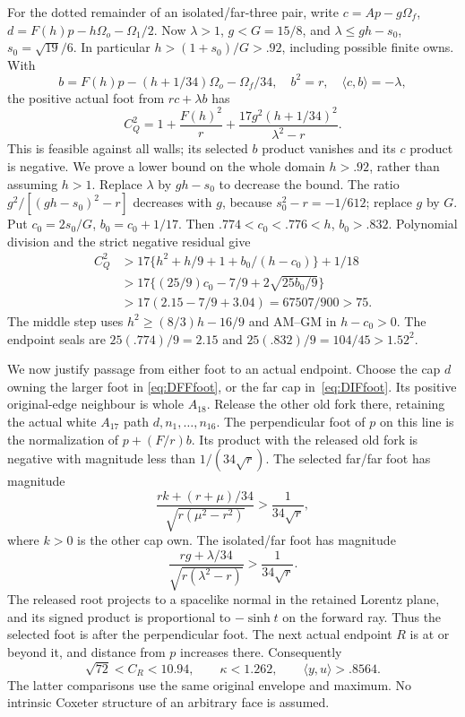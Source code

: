 \documentclass[11pt]{article}
\theoremstyle{definition}
\theoremstyle{remark}
\newcommand{\ip}[2]{\langle #1,#2\rangle}
\begin{document}
For the dotted remainder of an isolated/far-three pair,
write \(c=Ap-g\Omega_f\), \(d=F(h)p-h\Omega_o-\Omega_1/2\).
Now \(\lambda>1\), \(g<G=15/8\), and
\(\lambda\le gh-s_0\), \(s_0=\sqrt{19}/6\).
In particular \(h>(1+s_0)/G>.92\), including possible finite owns.
With
\[
 b=F(h)p-(h+1/34)\Omega_o-\Omega_f/34,\quad b^2=r,\quad
 \ip cb=-\lambda,
\]
the positive actual foot from \(rc+\lambda b\) has
\[
 C_Q^2=1+{\frac{F(h)^2}{ r}}
           +{\frac{17g^2(h+1/34)^2}{\lambda^2-r}}.
\]
This is feasible against all walls; its selected \(b\) product
vanishes and its \(c\) product is negative.
We prove a lower bound on the whole domain \(h>.92\),
rather than assuming \(h>1\).
Replace \(\lambda\) by \(gh-s_0\) to decrease the bound.
The ratio \(g^2/[(gh-s_0)^2-r]\) decreases with \(g\),
because \(s_0^2-r=-1/612\); replace \(g\) by \(G\).
Put \(c_0=2s_0/G\), \(b_0=c_0+1/17\).
Then \(.774<c_0<.776<h\), \(b_0>.832\).
Polynomial division and the strict negative residual give
\[
 \begin{split}
 C_Q^2&>17\{h^2+h/9+1+b_0/(h-c_0)\}+1/18\\
 &>17\{(25/9)c_0-7/9+2\sqrt{25b_0/9}\}\\
 &>17(2.15-7/9+3.04)=67507/900>75.
 \end{split}
\tag{DIFfoot}\label{eq:DIFfoot}
\]
The middle step uses \(h^2\ge(8/3)h-16/9\) and
AM--GM in \(h-c_0>0\).
The endpoint seals are \(25(.774)/9=2.15\) and
\(25(.832)/9=104/45>1.52^2\).

We now justify passage from either foot to an actual endpoint.
Choose the cap \(d\) owning the larger foot in
\eqref{eq:DFFfoot}, or the far cap in~\eqref{eq:DIFfoot}.
Its positive original-edge neighbour is whole \(A_{18}\).
Release the other old fork there, retaining the actual white
\(A_{17}\) path \(d,n_1,\ldots,n_{16}\).
The perpendicular foot of \(p\) on this line is the normalization of
\(p+(F/r)b\).
Its product with the released old fork is negative with magnitude
less than \(1/(34\sqrt r)\).
The selected far/far foot has magnitude
\[
 {\frac{rk+(r+\mu)/34}{\sqrt{r(\mu^2-r^2)}}}
                  >{\frac{1}{34\sqrt r}},
\]
where \(k>0\) is the other cap own.
The isolated/far foot has magnitude
\[
 {\frac{rg+\lambda/34}{\sqrt{r(\lambda^2-r)}}}
                  >{\frac{1}{34\sqrt r}}.
\]
The released root projects to a spacelike normal in the retained
Lorentz plane, and its signed product is proportional to
\(-\sinh t\) on the forward ray.
Thus the selected foot is after the perpendicular foot.
The next actual endpoint \(R\) is at or beyond it, and distance
from \(p\) increases there.  Consequently
\[
 \sqrt{72}<C_R<10.94,\qquad
 \kappa<1.262,\qquad\ip yu>.8564.
\tag{DFexit}\label{eq:DFexit}
\]
The latter comparisons use the same original envelope and maximum.
No intrinsic Coxeter structure of an arbitrary face is assumed.
\end{document}
